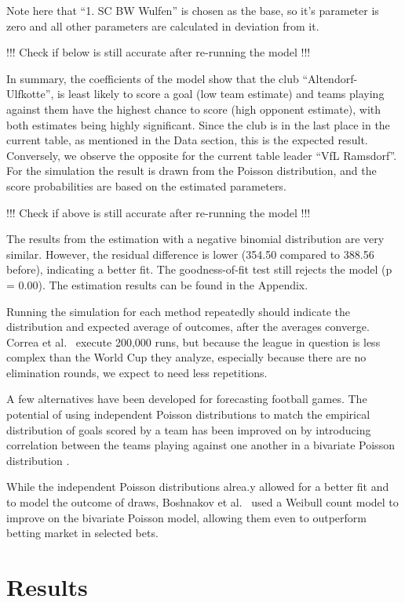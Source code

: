 \documentclass[12pt,a4paper]{article}
\begin{document}
Note here that \enquote{1. SC BW Wulfen} is chosen as the base, so it's
parameter is zero and all other parameters are calculated in deviation
from it.

!!! Check if below is still accurate after re-running the model !!!

In summary, the coefficients of the model show that the club
\enquote{Altendorf-Ulfkotte}, is least likely to score a goal (low team
estimate) and teams playing against them have the highest chance to
score (high opponent estimate), with both estimates being highly
significant. Since the club is in the last place in the current table,
as mentioned in the Data section, this is the expected result.
Conversely, we observe the opposite for the current table leader
\enquote{VfL Ramsdorf}. For the simulation the result is drawn from the
Poisson distribution, and the score probabilities are based on the
estimated parameters.

!!! Check if above is still accurate after re-running the model !!!

The results from the estimation with a negative binomial distribution
are very similar. However, the residual difference is lower (354.50
compared to 388.56 before), indicating a better fit. The goodness-of-fit
test still rejects the model (p = 0.00). The estimation results can be
found in the Appendix.

Running the simulation for each method repeatedly should indicate the
distribution and expected average of outcomes, after the averages
converge. Correa et al.~\autocite*{correa} execute 200,000 runs, but
because the league in question is less complex than the World Cup they
analyze, especially because there are no elimination rounds, we expect
to need less repetitions.

A few alternatives have been developed for forecasting football games.
The potential of using independent Poisson distributions to match the
empirical distribution of goals scored by a team has been improved on by
introducing correlation between the teams playing against one another in
a bivariate Poisson distribution \textcite{karlis2003}.

While the independent Poisson distributions alrea.y allowed for a better
fit and to model the outcome of draws, Boshnakov et
al.~\autocite*{boshnakov2016} used a Weibull count model to improve on
the bivariate Poisson model, allowing them even to outperform betting
market in selected bets.

\hypertarget{results}{%
\section{Results}\label{results}}
\end{document}

